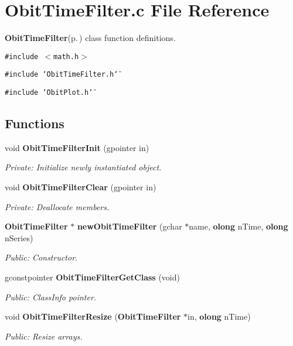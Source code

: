 \section{Obit\-Time\-Filter.c File Reference}
\label{ObitTimeFilter_8c}
{\bf Obit\-Time\-Filter}{\rm (p.\,\pageref{structObitTimeFilter})} class function definitions. 

{\tt \#include $<$math.h$>$}\par
{\tt \#include \char`\"{}Obit\-Time\-Filter.h\char`\"{}}\par
{\tt \#include \char`\"{}Obit\-Plot.h\char`\"{}}\par
\subsection*{Functions}
\begin{CompactItemize}
\item 
void {\bf Obit\-Time\-Filter\-Init} (gpointer in)
\begin{CompactList}\small\item\em Private: Initialize newly instantiated object. \item\end{CompactList}\item 
void {\bf Obit\-Time\-Filter\-Clear} (gpointer in)
\begin{CompactList}\small\item\em Private: Deallocate members. \item\end{CompactList}\item 
{\bf Obit\-Time\-Filter} $\ast$ {\bf new\-Obit\-Time\-Filter} (gchar $\ast$name, {\bf olong} n\-Time, {\bf olong} n\-Series)
\begin{CompactList}\small\item\em Public: Constructor. \item\end{CompactList}\item 
gconstpointer {\bf Obit\-Time\-Filter\-Get\-Class} (void)
\begin{CompactList}\small\item\em Public: Class\-Info pointer. \item\end{CompactList}\item 
void {\bf Obit\-Time\-Filter\-Resize} ({\bf Obit\-Time\-Filter} $\ast$in, {\bf olong} n\-Time)
\begin{CompactList}\small\item\em Public: Resize arrays. \item\end{CompactList}\item 

\end{CompactItemize}
